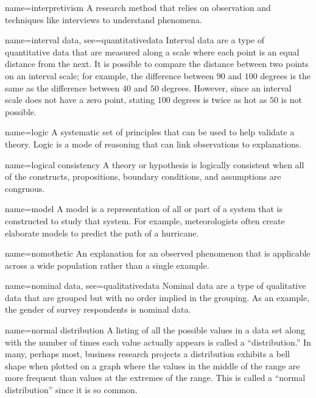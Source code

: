 {name={interpretivism}}
{%
	A research method that relies on observation and techniques like interviews to understand phenomena. 
}

{name={interval data},
	see={quantitativedata}}
{%
	Interval data are a type of quantitative data that are measured along a scale where each point is an equal distance from the next. It is possible to compare the distance between two points on an interval scale; for example, the difference between $ 90 $ and $ 100 $ degrees is the same as the difference between $ 40 $ and $ 50 $ degrees. However, since an interval scale does not have a zero point, stating $ 100 $ degrees is twice as hot as $ 50 $ is not possible. 
}


{name={logic}}
{%
	A systematic set of principles that can be used to help validate a theory. Logic is a mode of reasoning that can link observations to explanations.
}

{name={logical consistency}}
{%
	A theory or hypothesis is logically consistent when all of the constructs, propositions, boundary conditions, and assumptions are congruous.
}

{name={model}}
{%
	A model is a representation of all or part of a system that is constructed to study that system. For example, meteorologists often create elaborate models to predict 	the path of a hurricane. 
}

{name={nomothetic}}
{%
	An explanation for an observed phenomenon that is applicable across a wide population rather than a single example.
}

{name={nominal data},
	see={qualitativedata}}
{%
	Nominal data are a type of qualitative data that are grouped but with no order implied in the grouping. As an example, the gender of survey respondents is nominal data.
}

{name={normal distribution}}
{%
	A listing of all the possible values in a data set along with the number of times each value actually appears is called a ``distribution.'' In many, perhaps most, business research projects a distribution exhibits a bell shape when plotted on a graph where the values in the middle of the range are more frequent than values at the extremes of the range. This is called a ``normal distribution'' since it is so common.
}

